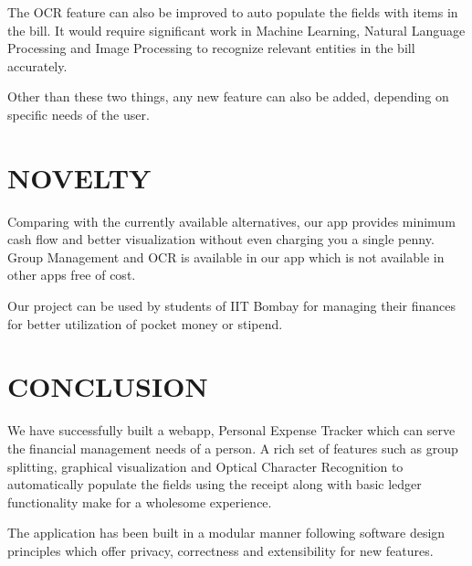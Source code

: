 \documentclass[12pt]{article}
\begin{document}
The OCR feature can also be improved to auto populate the fields with items in the bill. It would require significant work in Machine Learning, Natural Language Processing and Image Processing to recognize relevant entities in the bill accurately.

Other than these two things, any new feature can also be added, depending on specific needs of the user.

\section{NOVELTY}
Comparing with the currently available alternatives, our app provides minimum cash flow and better visualization without even charging you a single penny. Group Management and OCR is available in our app which is not available in other apps free of cost.

Our project can be used by students of IIT Bombay for managing their finances for better utilization of pocket money or stipend.

\newpage
\section{CONCLUSION}

We have successfully built a webapp, Personal Expense Tracker which can serve the financial management needs of a person. A rich set of features such as group splitting, graphical visualization and Optical Character Recognition to automatically populate the fields using the receipt along with basic ledger functionality make for a wholesome experience.

The application has been built in a modular manner following software design principles which offer privacy, correctness and extensibility for new features.




\newpage


\end{document}

